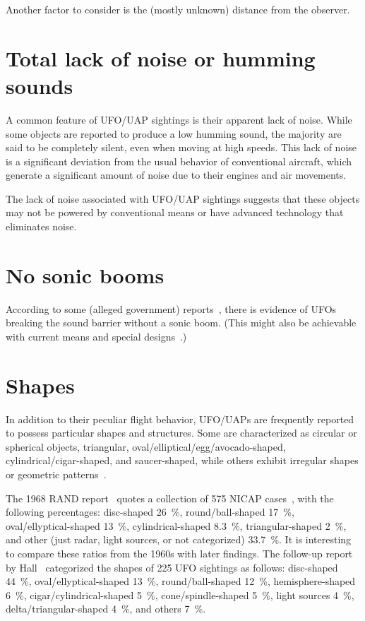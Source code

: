 Another factor to consider is the (mostly unknown) distance from the observer.


\section{Total lack of noise or humming sounds}
\label{2023-UFO-part-Perception-flight-characteristics-lnhs}

A common feature of UFO/UAP sightings is their apparent lack of noise. While some objects are reported to produce a low humming sound, the majority are said to be completely silent, even when moving at high speeds. This lack of noise is a significant deviation from the usual behavior of conventional aircraft, which generate a significant amount of noise due to their engines and air movements.

The lack of noise associated with UFO/UAP sightings suggests that these objects may not be powered by conventional means or have advanced technology that eliminates noise.

\section{No sonic booms}

According to some (alleged government) reports~\cite{Daniels2021Mar,Pappas2021Mar},
there is evidence of UFOs breaking the sound barrier without a sonic boom.
(This might also be achievable with current means and special designs~\cite{Figliozzi2020Nov}.)


\section{Shapes}
\label{2023-UFO-part-Perception-flight-characteristics-sh}

In addition to their peculiar flight behavior, UFO/UAPs are frequently reported to possess particular shapes and structures. Some are characterized as circular or spherical objects, triangular, oval/elliptical/egg/avocado-shaped, cylindrical/cigar-shaped, and saucer-shaped, while others exhibit irregular shapes or geometric patterns~\cite[p.~12]{Hill2014Jun}.

The 1968 RAND report~\cite[p.~24]{Kocher-RAND-1968Jan} quotes a collection of 575 NICAP cases~\cite{Hall1964}, with the following percentages:
disc-shaped 26~{\%},
round/ball-shaped  17~{\%},
oval/ellyptical-shaped 13~{\%},
cylindrical-shaped 8.3~{\%},
triangular-shaped 2~{\%},
and other (just radar, light sources, or not categorized) 33.7~{\%}.
It is interesting to compare these ratios from the 1960s with later findings.
The follow-up report by Hall~\cite[p.~446]{Hall2001Jan} categorized the shapes of 225 UFO sightings as follows:
disc-shaped 44~{\%},
oval/ellyptical-shaped 13~{\%},
round/ball-shaped  12~{\%},
hemisphere-shaped 6~{\%},
cigar/cylindrical-shaped   5~{\%},
cone/spindle-shaped 5~{\%},
light sources 4~{\%},
delta/triangular-shaped 4~{\%}, and
others 7~{\%}.





